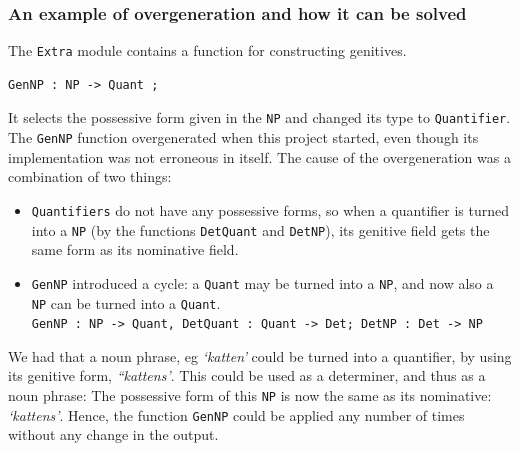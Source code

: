 \documentclass{report}
\begin{document}




\subsubsection{An example of overgeneration and how it can be solved}
The \verb-Extra- module contains a function for constructing genitives.
\begin{verbatim}GenNP : NP -> Quant ;\end{verbatim}
It selects the possessive form given in the \verb-NP- and changed its type
to \verb-Quantifier-. 
The \verb-GenNP- function %
overgenerated when this project started, even
though its implementation was not erroneous in itself. The cause of the overgeneration 
was a combination of two things:
\begin{itemize}
\item \verb-Quantifiers- do not have any possessive
forms, so when a quantifier is turned into
a \verb-NP- (by the functions \verb-DetQuant- and \verb-DetNP-), its genitive field gets
the same form as its nominative field.
\item\verb-GenNP-
introduced a cycle: a \verb-Quant- may be turned into a \verb-NP-, and now also
a \verb-NP- can be turned into a \verb-Quant-.\\
\verb|GenNP : NP -> Quant, DetQuant : Quant -> Det; DetNP : Det -> NP|
\end{itemize}
We had that a noun phrase, eg \emph{`katten'} could be turned into a quantifier,
by using its genitive form, \emph{``kattens'}. This could be used as a determiner,
\newpage %
and thus as a noun phrase:
The possessive form of this \verb-NP- is now the same as its nominative:
\emph{`kattens'}. Hence, the function \verb-GenNP- could be applied
any number of times without any change in the output.
\end{document}
